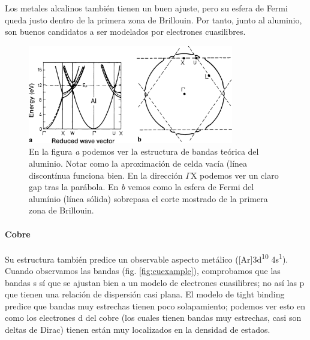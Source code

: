 Los metales alcalinos también tienen un buen ajuste, pero su esfera de
Fermi queda justo dentro de la primera zona de Brillouin. Por tanto,
junto al aluminio, son buenos candidatos a ser modelados por
electrones cuasilibres.
\begin{figure}
  \centering
  \includegraphics[width=0.8\textwidth]{figures/alexample.png}
  \caption{En la figura \emph{a} podemos ver la estructura de bandas
    teórica del aluminio. Notar como la aproximación de celda vacía
    (línea discontínua funciona bien. En la dirección
    $\Gamma \text{X} $ podemos ver un claro gap tras la parábola. En
    \emph{b} vemos como la esfera de Fermi del alumínio (línea sólida)
    sobrepasa el corte mostrado de la primera zona de Brillouin.}
  \label{fig:alexample}
\end{figure}

\paragraph{Cobre} Su estructura también predice un observable aspecto
metálico ([Ar]3d\textsuperscript {10} 4s\textsuperscript 1). Cuando
observamos las bandas (fig. \ref{fig:cuexample}), comprobamos que las
bandas s sí que se ajustan bien a un modelo de electrones cuasilibres;
no así las p que tienen una relación de dispersión casi plana. El
modelo de tight binding predice que bandas muy estrechas tienen poco
solapamiento; podemos ver esto en como los electrones d del cobre (los
cuales tienen bandas muy estrechas, casi son deltas de Dirac) tienen
están muy localizados en la densidad de estados.

